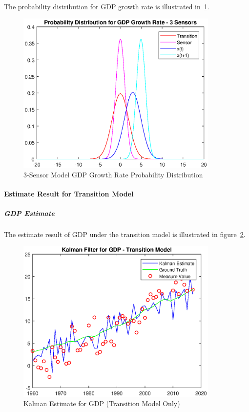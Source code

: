 \documentclass[11pt, a4paper]{article}
\begin{document}
The probability distribution for GDP growth rate is illustrated in~\ref{fig:pd_4}.

\begin{figure}[htbp]
	
	\centering 
	\includegraphics[width=10cm]{pd_4}
	
	\caption{3-Sensor Model GDP Growth Rate Probability Distribution}
	\label{fig:pd_4}
	
\end{figure}


\paragraph{Estimate Result for Transition Model}

\subparagraph{GDP Estimate}

The estimate result of GDP under the transition model is illustrated in figure~\ref{fig:kf5}.

\begin{figure}[htbp]
	
	\centering 
	\includegraphics[width=10cm]{kf_2_1}
	
	\caption{Kalman Estimate for GDP (Transition Model Only)}
	\label{fig:kf5}
	
\end{figure}
\end{document}
